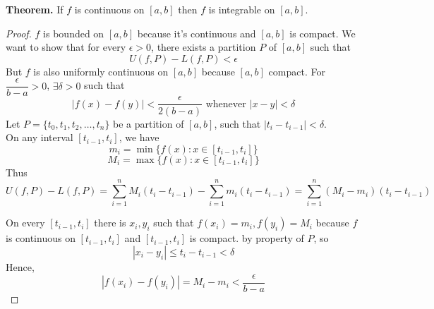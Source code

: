 \documentclass[10pt,letterpaper]{article}
\begin{document}
	
	\textbf{Theorem. }
	If $f$ is continuous on $[a, b]$ then $f$ is integrable on $[a, b]$.
	\begin{proof}
		$f$ is bounded on $[a, b]$ because it's continuous and $[a, b]$ is compact. 
		We want to show that for every $\epsilon > 0$, there exists a partition $P$
		of $[a, b]$ such that 
		$$U(f, P) - L(f, P) < \epsilon$$
		But $f$ is also uniformly continuous on $[a, b]$ because $[a, b]$ compact.
		For $\dfrac{\epsilon}{b - a} > 0$, $\exists \delta > 0$ such that
		$$|f(x) - f(y)| < \dfrac{\epsilon}{2(b - a)} \text{ whenever } |x - y| < \delta$$
		Let $P = \{t_0, t_1, t_2, \ldots, t_n\}$ be a partition of $[a, b]$,
		such that $|t_i - t_{i-1}| < \delta$. \\
		On any interval $[t_{i-1}, t_i]$, we have
		$$m_i = \min\{f(x) : x \in [t_{i-1}, t_i]\}$$
		$$M_i = \max\{f(x) : x \in [t_{i-1}, t_i]\}$$
		Thus
		$$U(f, P) - L(f, P) = 
		\displaystyle\sum_{i=1}^{n} M_i(t_i - t_{i-1}) - \displaystyle\sum_{i=1}^{n} m_i(t_i - t_{i-1})
			= \displaystyle\sum_{i=1}^{n}(M_i - m_i)(t_i - t_{i-1})$$
			
		On every $[t_{i-1}, t_i]$ there is $x_i, y_i$ such that
		$f(x_i) = m_i, f(y_i) = M_i$ because $f$ is continuous on $[t_{i-1}, t_i]$ and $[t_{i-1}, t_i]$ is compact.
		by property of $P$, so
		$$|x_i - y_i| \leq t_i - t_{i-1} < \delta$$
		Hence,
		$$|f(x_i) - f(y_i)| = M_i - m_i < \dfrac{\epsilon}{b - a}$$
	\end{proof}
	
\end{document}
